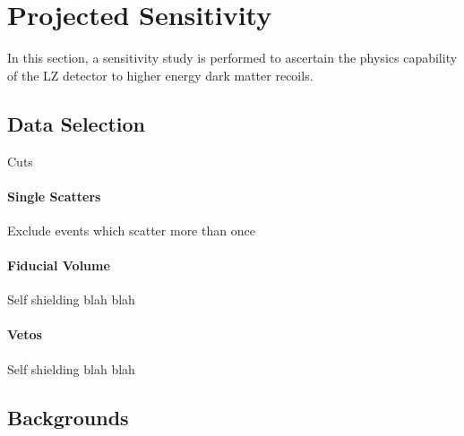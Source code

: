 \section{Projected Sensitivity}
\par
In this section, a sensitivity study is performed to ascertain the physics capability of the LZ detector to higher energy dark matter recoils.

\subsection{Data Selection}
\par
Cuts

\paragraph{Single Scatters}
Exclude events which scatter more than once

\paragraph{Fiducial Volume}
Self shielding blah blah

\paragraph{Vetos}
Self shielding blah blah




\subsection{Backgrounds}
\par

